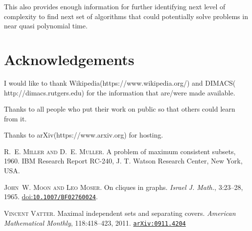 \documentclass[12pt]{article}
\newcommand{\doi}[1]{\href{http://dx.doi.org/#1}{doi:\texttt{#1}}}
\newcommand{\arxiv}[1]{\href{http://arxiv.org/abs/#1}{\texttt{arXiv:#1}}}
\theoremstyle{plain}
\theoremstyle{definition}
\begin{document}
This also provides enough information for further identifying next level of complexity to find next set of algorithms that could potentially solve problems in near quasi polynomial time.

\section{Acknowledgements}
I would like to thank Wikipedia(https://www.wikipedia.org/) and DIMACS( http://dimacs.rutgers.edu) for the information that are/were made available.

Thanks to all people who put their work on public so that others could learn from it.

Thanks to arXiv(https://www.arxiv.org) for hosting.

\begin{thebibliography}{B-N-R}

\textsc{R.~E. Miller and D.~E. Muller}.
\newblock A problem of maximum consistent subsets, 1960.
\newblock IBM Research Report RC-240, J. T. Watson Research Center, New York,
USA.

\textsc{John~W. Moon and Leo Moser}.
\newblock On cliques in graphs.
\newblock \emph{Israel J. Math.}, 3:23--28, 1965.
\newblock \doi{10.1007/BF02760024}.

\textsc{Vincent Vatter}.
\newblock Maximal independent sets and separating covers.
\newblock \emph{American Mathematical Monthly}, 118:418--423, 2011.
\newblock \arxiv{0911.4204}


\end{thebibliography}
\end{document}
